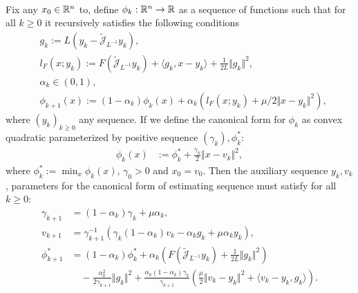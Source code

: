 \documentclass[12pt]{article}
\begin{document}
    \begin{theorem}\label{thm:canon-prox-grad-est-seq}
        \; \\
        Fix any $x_0 \in \mathbb R^n$ to, 
        define $\phi_k:\mathbb R^n \rightarrow\mathbb R$ as a sequence of functions such that for all $k\ge 0$ it recursively satisfies the following conditions 
        \begin{align*}
            & g_k := L(y_k - \widetilde{\mathcal J}_{L^{-1}} y_k),
            \\
            & l_F(x; y_k) := 
                F\left(\widetilde{\mathcal J}_{L^{-1}} y_k\right) 
                + \langle g_k, x - y_k\rangle 
                + \frac{1}{2L}\Vert g_k\Vert^2, 
            \\
            & \alpha_k \in (0, 1),
            \\
            & 
            \phi_{k + 1}(x)
            := (1 - \alpha_k)\phi_k (x) + 
            \alpha_k (l_F(x; y_k) + \mu/2\Vert x - y_k\Vert^2), 
        \end{align*}
        where $(y_k)_{k\ge 0}$ any sequence. 
        If we define the canonical form for $\phi_k$ as convex quadratic parameterized by positive sequence $(\gamma_k), \phi_k^*$:  
        \begin{align*}
            \phi_k(x) &:= \phi_k^* + \frac{\gamma_k}{2}\Vert x - v_k\Vert^2, 
        \end{align*}
        where $\phi_k^* := \min_{x} \phi_k(x)$, $\gamma_0 > 0$ and $x_0 = v_0$. 
        Then the auxiliary sequence $y_k, v_k$, parameters for the canonical form of estimating sequence must satisfy for all $k\ge 0$: 
        {\small
        \begin{align*}      
            \gamma_{k + 1} &= (1 - \alpha_k) \gamma_k + \mu \alpha_k,
            \\
            v_{k + 1} &= \gamma_{k + 1}^{-1}
            (\gamma_k(1 - \alpha_k)v_k - \alpha_k g_k + \mu \alpha_k y_k),
            \\
            \phi_{k + 1}^* &= 
            (1 - \alpha_k)\phi_k^*
            + \alpha_k\left(
                F\left(\widetilde{\mathcal J}_{L^{-1}} y_k\right) 
                + \frac{1}{2L}\Vert g_k\Vert^2 
            \right) 
            \\
                &\quad 
                - \frac{\alpha_k^2}{2 \gamma_{k + 1}} \Vert g_k\Vert^2 
                + 
                \frac{\alpha_k(1 - \alpha_k)\gamma_k}{\gamma_{k + 1}} 
                \left(
                    \frac{\mu}{2}\Vert v_k - y_k\Vert^2 
                    + \langle v_k - y_k , g_k\rangle
                \right). 
        \end{align*}
        }
    \end{theorem}
    
\end{document}
